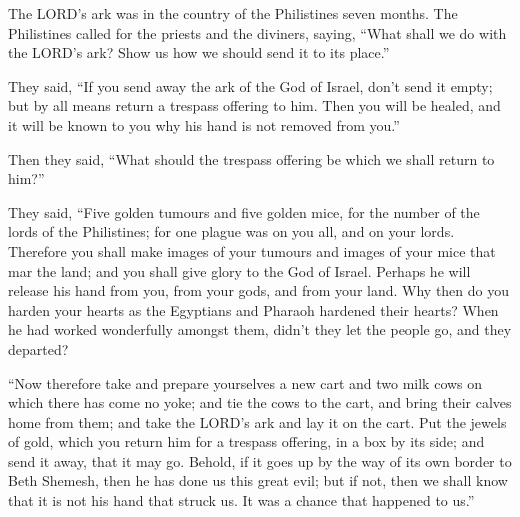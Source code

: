  The LORD's ark was in the country of the Philistines
seven months.  The Philistines called for the priests and
the diviners, saying, ``What shall we do with the LORD's ark? Show us
how we should send it to its place.''

 They said, ``If you send away the ark of the God of
Israel, don't send it empty; but by all means return a trespass offering
to him. Then you will be healed, and it will be known to you why his
hand is not removed from you.''

 Then they said, ``What should the trespass offering be
which we shall return to him?''

They said, ``Five golden tumours and five golden mice, for the number of
the lords of the Philistines; for one plague was on you all, and on your
lords.  Therefore you shall make images of your tumours
and images of your mice that mar the land; and you shall give glory to
the God of Israel. Perhaps he will release his hand from you, from your
gods, and from your land.  Why then do you harden your
hearts as the Egyptians and Pharaoh hardened their hearts? When he had
worked wonderfully amongst them, didn't they let the people go, and they
departed?

 ``Now therefore take and prepare yourselves a new cart
and two milk cows on which there has come no yoke; and tie the cows to
the cart, and bring their calves home from them;  and take
the LORD's ark and lay it on the cart. Put the jewels of gold, which you
return him for a trespass offering, in a box by its side; and send it
away, that it may go.  Behold, if it goes up by the way of
its own border to Beth Shemesh, then he has done us this great evil; but
if not, then we shall know that it is not his hand that struck us. It
was a chance that happened to us.''

